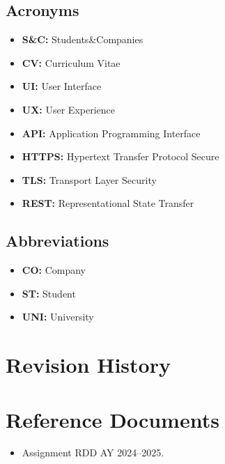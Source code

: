 \subsection{Acronyms}\label{subsec:acronyms}
\begin{itemize}
    \item \textbf{S\&C:} Students\&Companies
    \item \textbf{CV:} Curriculum Vitae
    \item \textbf{UI:} User Interface
    \item \textbf{UX:} User Experience
    \item \textbf{API:} Application Programming Interface
    \item \textbf{HTTPS:} Hypertext Transfer Protocol Secure
    \item \textbf{TLS:} Transport Layer Security
    \item \textbf{REST:} Representational State Transfer

\end{itemize}

\subsection{Abbreviations}\label{subsec:abbreviations}
\begin{itemize}
    \item \textbf{CO:} Company
    \item \textbf{ST:} Student
    \item \textbf{UNI:} University
\end{itemize}

\section{Revision History}\label{sec:revision history}

\section{Reference Documents}\label{sec:reference documents}
\begin{itemize}
    \item Assignment RDD AY 2024–2025.
\end{itemize}

